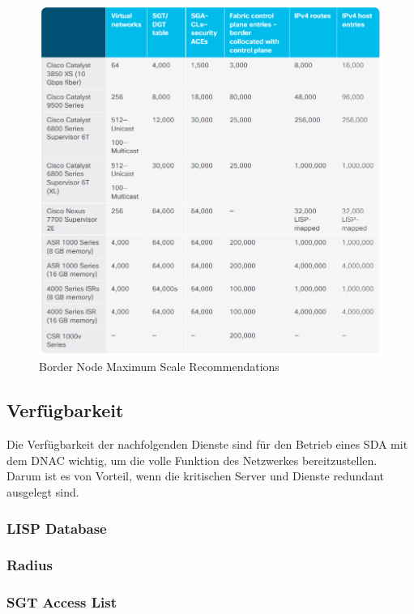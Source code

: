 \begin{figure}[H]
	\centering
	\includegraphics[width=1\linewidth]{img/Analyse/MaxScale-BorderNode}
	\caption{Border Node Maximum Scale Recommendations \cite{sda-designguide} }
	\label{fig:Border Node Maximum Scale RecommendationsA}
\end{figure}




\subsection{Verfügbarkeit}
Die Verfügbarkeit der nachfolgenden Dienste sind für den Betrieb eines SDA mit dem DNAC wichtig, um die volle Funktion des Netzwerkes bereitzustellen. Darum ist es von Vorteil, wenn die kritischen Server und Dienste redundant ausgelegt sind.


\subsubsection{LISP Database}

\subsubsection{Radius}

\subsubsection{SGT Access List}

